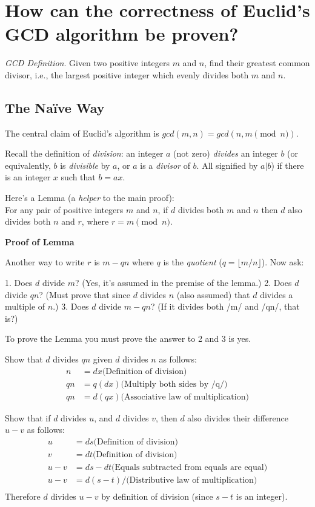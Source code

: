 \documentclass[12pt]{amsart}
\begin{document}
 \section{How can the correctness of Euclid's GCD algorithm be proven?}
  \textit{GCD Definition}. Given two positive integers $m$ and $n$,
  find their greatest common divisor, i.e., the largest positive integer which
  evenly divides both $m$ and $n$.
   
\subsection{The Na\"ive Way}

The central claim of Euclid's algorithm is $gcd(m, n) = gcd(n, m\pmod n)$.

  Recall the definition of \textit{division}: an integer $a$ (not zero) \textit{divides} an
  integer $b$ (or equivalently, $b$ is \textit{divisible} by $a$, or $a$ is a \textit{divisor}
  of $b$. All signified by $a|b$) if there is an integer $x$ such that $b = ax.$

  Here's a Lemma (a \textit{helper} to the main proof):\\
  
  For any pair of positive integers $m$ and $n$, if $d$ divides both $m$ and $n$  then $d$ also divides both $n$ and $r$, where $r = m\pmod n.$

\textbf{Proof of Lemma}

  Another way to write $r$ is $m - qn$ where $q$ is the \textit{quotient} ($q
  = \lfloor m / n \rfloor$). Now ask:

  1. Does $d$ divide $m$? (Yes, it's assumed in the premise of the lemma.)
  2. Does $d$ divide $qn$? (Must prove that since $d$ divides $n$ (also assumed)
     that $d$ divides a multiple of $n$.)
  3. Does $d$ divide $m - qn$? (If it divides both /m/ and /qn/, that is?)

  To prove the Lemma you must prove the answer to 2 and 3 is yes.

  Show that $d$ divides $qn$ given $d$ divides $n$ as follows:
\begin{align}
  n &= dx  \text{(Definition of division)}\\      
  qn  &=  q(dx) \text{(Multiply both sides by /q/)}\\
  qn &= d(qx) \text{(Associative law of multiplication)}
  \end{align}

  Show that if $d$ divides $u$, and $d$ divides $v$, then $d$ also divides their
  difference $u - v$ as follows:
\begin{align}
  u &= ds \text{(Definition of division)}\\
  v &= dt \text{(Definition of division)}\\
  u - v &= ds - dt \text{(Equals subtracted from equals are equal)}\\
  u - v &= d(s - t)/ \text{(Distributive law of multiplication)}\\
\end{align}
  Therefore $d$ divides $u - v$ by definition of division (since $s - t$ is an integer).
\end{document}
